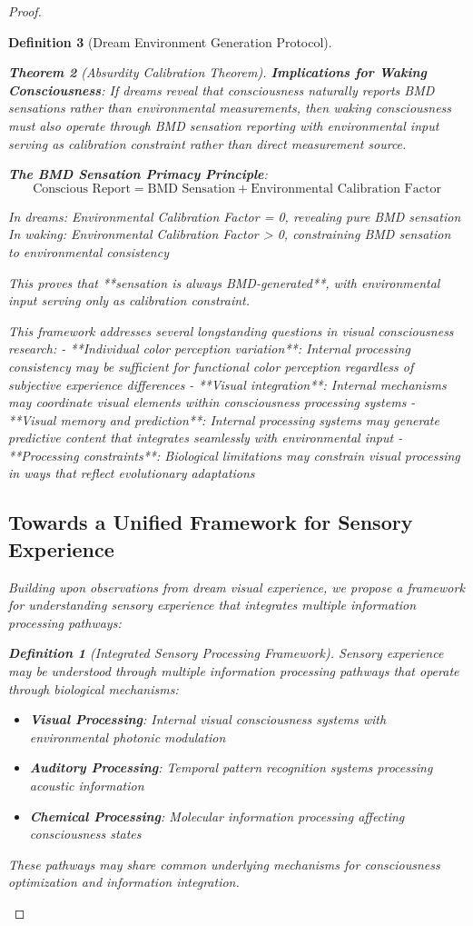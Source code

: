 \documentclass[12pt,a4paper]{article}
\newtheorem{theorem}{Theorem}[section]
\newtheorem{definition}[theorem]{Definition}
\begin{document}
\begin{proof}
\begin{definition}[Dream Environment Generation Protocol]
\begin{theorem}[Absurdity Calibration Theorem]
\textbf{Implications for Waking Consciousness}:
If dreams reveal that consciousness naturally reports BMD sensations rather than environmental measurements, then waking consciousness must also operate through BMD sensation reporting with environmental input serving as calibration constraint rather than direct measurement source.

\textbf{The BMD Sensation Primacy Principle}:
$$\text{Conscious Report} = \text{BMD Sensation} + \text{Environmental Calibration Factor}$$

In dreams: Environmental Calibration Factor = 0, revealing pure BMD sensation
In waking: Environmental Calibration Factor > 0, constraining BMD sensation to environmental consistency

This proves that **sensation is always BMD-generated**, with environmental input serving only as calibration constraint.

This framework addresses several longstanding questions in visual consciousness research:
- **Individual color perception variation**: Internal processing consistency may be sufficient for functional color perception regardless of subjective experience differences
- **Visual integration**: Internal mechanisms may coordinate visual elements within consciousness processing systems
- **Visual memory and prediction**: Internal processing systems may generate predictive content that integrates seamlessly with environmental input
- **Processing constraints**: Biological limitations may constrain visual processing in ways that reflect evolutionary adaptations

\subsection{Towards a Unified Framework for Sensory Experience}

Building upon observations from dream visual experience, we propose a framework for understanding sensory experience that integrates multiple information processing pathways:

\begin{definition}[Integrated Sensory Processing Framework]
Sensory experience may be understood through multiple information processing pathways that operate through biological mechanisms:
\begin{itemize}
\item \textbf{Visual Processing}: Internal visual consciousness systems with environmental photonic modulation
\item \textbf{Auditory Processing}: Temporal pattern recognition systems processing acoustic information
\item \textbf{Chemical Processing}: Molecular information processing affecting consciousness states
\end{itemize}
These pathways may share common underlying mechanisms for consciousness optimization and information integration.
\end{definition}


\end{theorem}
\end{definition}
\end{proof}
\end{document}
